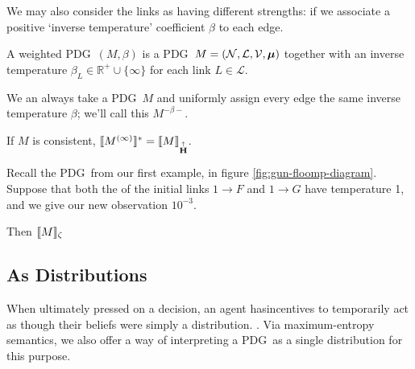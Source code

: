 \documentclass{article}
\newcommand\changed[1]{{\color{note-fg} #1}}
\newcommand\changeoff{\color{black} }
\newcommand\MaxEnt{{\overset{\uparrow}{\mathbf H}}}
\newcommand\bmu{\boldsymbol{\mu}}
\newcommand{\MN}{PDG}
\begin{document}
	We may also consider the links as having different strengths: if we associate a positive `inverse temperature' coefficient $\beta$ to each edge.
	
	\begin{defn}
		A weighted \MN\ $(M, \beta)$ is a \MN\ $M = (\cal N, L, V, \bmu)$ together with an inverse temperature $\beta_L \in \mathbb R^+ \cup \{\infty\}$ for each link $L \in \mathcal L$.
	\end{defn}

	We an always take a \MN\ $M$ and uniformly assign every edge the same inverse temperature $\beta$; we'll call this $M^{-\beta-}$.
	
	\begin{prop}
		If $M$ is consistent, $\bbr{M^{(\infty)}}^* = \bbr{M}_\MaxEnt$.
	\end{prop}


	\begin{example}[continues=ex:guns-and-floomps]
		Recall the \MN\ from our first example, in figure \ref{fig:gun-floomp-diagram}. Suppose that both the of the initial links $1 \to F$ and $1\to G$ have temperature 1, and we give our new observation $10^{-3}$.
		
		Then $\llbracket M\rrbracket_\zeta$
		\todo{}
	\end{example}	
	
	
	\changeoff
	
	\subsection{As Distributions}
	
	
	\changed{When ultimately pressed on a decision, an agent hasincentives to temporarily act as though their beliefs were simply a distribution. }. Via maximum-entropy semantics, we also offer a way of interpreting a \MN\ as a single distribution for this purpose. 
	
\end{document}
